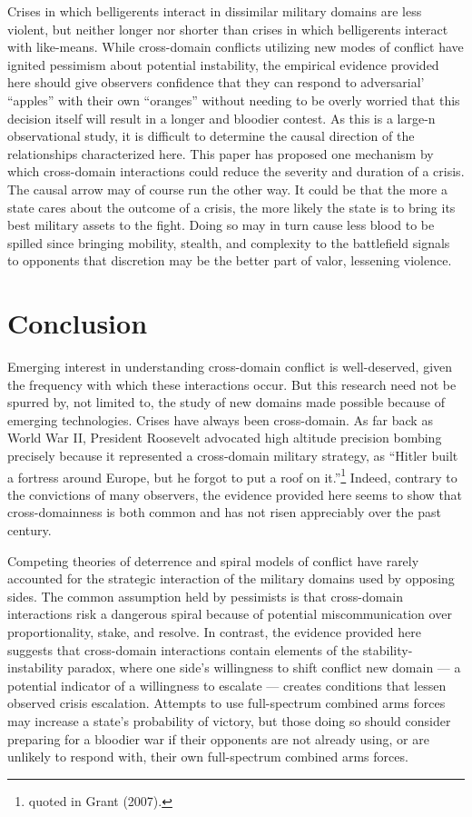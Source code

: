 \documentclass[
]{article}
\begin{document}
Crises in which belligerents interact in dissimilar military domains are less violent, but neither longer nor shorter than crises in which belligerents interact with like-means. While cross-domain conflicts utilizing new modes of conflict have ignited pessimism about potential instability, the empirical evidence provided here should give observers confidence that they can respond to adversarial' ``apples'' with their own ``oranges'' without needing to be overly worried that this decision itself will result in a longer and bloodier contest. As this is a large-n observational study, it is difficult to determine the causal direction of the relationships characterized here. This paper has proposed one mechanism by which cross-domain interactions could reduce the severity and duration of a crisis. The causal arrow may of course run the other way. It could be that the more a state cares about the outcome of a crisis, the more likely the state is to bring its best military assets to the fight. Doing so may in turn cause less blood to be spilled since bringing mobility, stealth, and complexity to the battlefield signals to opponents that discretion may be the better part of valor, lessening violence.

\hypertarget{conclusion}{%
\section{Conclusion}\label{conclusion}}

Emerging interest in understanding cross-domain conflict is well-deserved, given the frequency with which these interactions occur. But this research need not be spurred by, not limited to, the study of new domains made possible because of emerging technologies. Crises have always been cross-domain. As far back as World War II, President Roosevelt advocated high altitude precision bombing precisely because it represented a cross-domain military strategy, as ``Hitler built a fortress around Europe, but he forgot to put a roof on it.''\footnote{quoted in Grant (2007).} Indeed, contrary to the convictions of many observers, the evidence provided here seems to show that cross-domainness is both common and has not risen appreciably over the past century.

Competing theories of deterrence and spiral models of conflict have rarely accounted for the strategic interaction of the military domains used by opposing sides. The common assumption held by pessimists is that cross-domain interactions risk a dangerous spiral because of potential miscommunication over proportionality, stake, and resolve. In contrast, the evidence provided here suggests that cross-domain interactions contain elements of the stability-instability paradox, where one side's willingness to shift conflict new domain --- a potential indicator of a willingness to escalate --- creates conditions that lessen observed crisis escalation. Attempts to use full-spectrum combined arms forces may increase a state's probability of victory, but those doing so should consider preparing for a bloodier war if their opponents are not already using, or are unlikely to respond with, their own full-spectrum combined arms forces.
\end{document}
